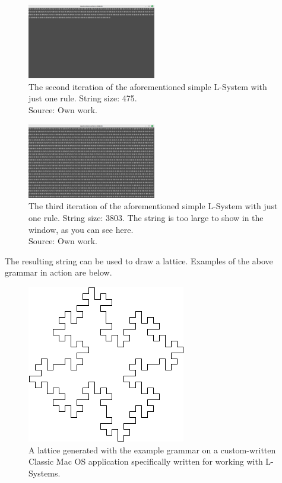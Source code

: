 \begin{figure}[H]
	\centering
	\includegraphics[width=0.5\textwidth]{Images/initial-l-system-iteration-2.png}
	\caption{The second iteration of the aforementioned simple L-System with just one rule. String size: 475.\\Source: Own work.}
	\label{fig:lsysiter2}
\end{figure}

\begin{figure}[H]
	\centering
	\includegraphics[width=0.5\textwidth]{Images/initial-l-system-iteration-3.png}
	\caption{The third iteration of the aforementioned simple L-System with just one rule. String size: 3803. The string is too large to show in the window, as you can see here.\\Source: Own work.}
	\label{fig:lsysiter3}
\end{figure}

The resulting string can be used to draw a lattice.\cite{lsyspaulbourke} Examples of the above grammar in action are below.

\begin{figure}[H]
    \centering
    \includegraphics[height=0.25\textheight]{Images/lsys03.png}
    \caption{A lattice generated with the example grammar on a custom-written Classic Mac OS application specifically written for working with L-Systems.\cite{lsyspaulbourke}}
    \label{fig:lattice1}
\end{figure}

